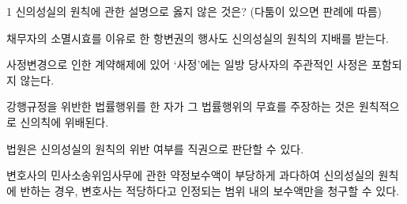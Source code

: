 \begin{question}{1}
신의성실의 원칙에 관한 설명으로 옳지 않은 것은? (다툼이 있으면 판례에 따름)
\begin{choices}
  \item 채무자의 소멸시효를 이유로 한 항변권의 행사도 신의성실의 원칙의 지배를 받는다.
  \item 사정변경으로 인한 계약해제에 있어 ‘사정’에는 일방 당사자의 주관적인 사정은 포함되지 않는다.
  \item 강행규정을 위반한 법률행위를 한 자가 그 법률행위의 무효를 주장하는 것은 원칙적으로 신의칙에 위배된다.
  \item 법원은 신의성실의 원칙의 위반 여부를 직권으로 판단할 수 있다.
  \item 변호사의 민사소송위임사무에 관한 약정보수액이 부당하게 과다하여 신의성실의 원칙에 반하는 경우, 변호사는 적당하다고 인정되는 범위 내의 보수액만을 청구할 수 있다.
\end{choices}
\end{question}

